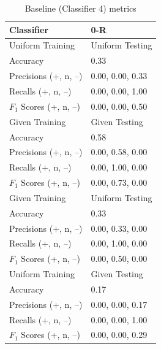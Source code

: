 \documentclass[11pt]{article}
\begin{document}
\begin{table}[H]
	\begin{center}
		\begin{tabular}{|l|l|}			
			\hline
			Classifier & 0-R \\
			\hline\hline
			Uniform Training & Uniform Testing \\
			\hline
			Accuracy & 0.33 \\
			Precisions (+, n, --) 	& 0.00, 0.00, 0.33 \\
			Recalls (+, n, --) 		& 0.00, 0.00, 1.00 \\
			$F_1$ Scores (+, n, --) & 0.00, 0.00, 0.50 \\
			\hline\hline
			Given Training & Given Testing \\
			\hline
			Accuracy & 0.58 \\
			Precisions (+, n, --) 	& 0.00, 0.58, 0.00 \\
			Recalls (+, n, --) 		& 0.00, 1.00, 0.00 \\
			$F_1$ Scores (+, n, --) & 0.00, 0.73, 0.00 \\
			\hline\hline
			Given Training & Uniform Testing \\
			\hline
			Accuracy & 0.33 \\
			Precisions (+, n, --) 	& 0.00, 0.33, 0.00 \\
			Recalls (+, n, --) 		& 0.00, 1.00, 0.00 \\
			$F_1$ Scores (+, n, --) & 0.00, 0.50, 0.00 \\
			\hline\hline
			Uniform Training & Given Testing \\
			\hline
			Accuracy & 0.17 \\
			Precisions (+, n, --) 	& 0.00, 0.00, 0.17 \\
			Recalls (+, n, --) 		& 0.00, 0.00, 1.00 \\
			$F_1$ Scores (+, n, --) & 0.00, 0.00, 0.29 \\
			\hline
		\end{tabular}
		\caption{Baseline (Classifier 4) metrics}
		\label{tbl:metrics-base10000}
	\end{center}
\end{table}

\end{document}
